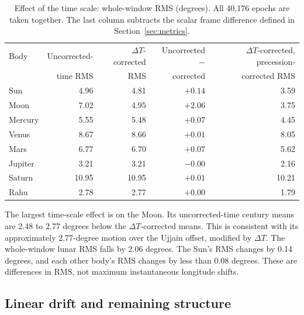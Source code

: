 \documentclass[11pt,a4paper]{article}
\newcommand{\toprule}{\hline\hline}%
\newcommand{\midrule}{\hline}%
\newcommand{\bottomrule}{\hline\hline}}
\newcommand{\dT}{$\Delta T$}
\begin{document}
\begin{table}[htbp]
\centering
\caption{Effect of the time scale: whole-window RMS (degrees). All 40,176 epochs are taken together. The last column subtracts the scalar frame difference defined in Section~\ref{sec:metrics}.}
\label{tab:timescale}
\small
\begin{tabular}{@{}lrrrr@{}}
\toprule
Body & Uncorrected- & \dT{}-corrected & Uncorrected $-$ & \dT{}-corrected, precession- \\
     & time RMS & RMS & corrected & corrected RMS \\
\midrule
Sun     & 4.96  & 4.81  & $+0.14$ & 3.59 \\
Moon    & 7.02  & 4.95  & $+2.06$ & 3.75 \\
Mercury & 5.55  & 5.48  & $+0.07$ & 4.45 \\
Venus   & 8.67  & 8.66  & $+0.01$ & 8.05 \\
Mars    & 6.77  & 6.70  & $+0.07$ & 5.62 \\
Jupiter & 3.21  & 3.21  & $-0.00$ & 2.16 \\
Saturn  & 10.95 & 10.95 & $+0.01$ & 10.21 \\
Rahu    & 2.78  & 2.77  & $+0.00$ & 1.79 \\
\bottomrule
\end{tabular}
\end{table}

The largest time-scale effect is on the Moon. Its uncorrected-time century means are 2.48 to 2.77 degrees below the \dT{}-corrected means. This is consistent with its approximately 2.77-degree motion over the Ujjain offset, modified by \dT{}. The whole-window lunar RMS falls by 2.06 degrees. The Sun's RMS changes by 0.14 degrees, and each other body's RMS changes by less than 0.08 degrees. These are differences in RMS, not maximum instantaneous longitude shifts.

\subsection{Linear drift and remaining structure}
\label{sec:decomp}
\end{document}
